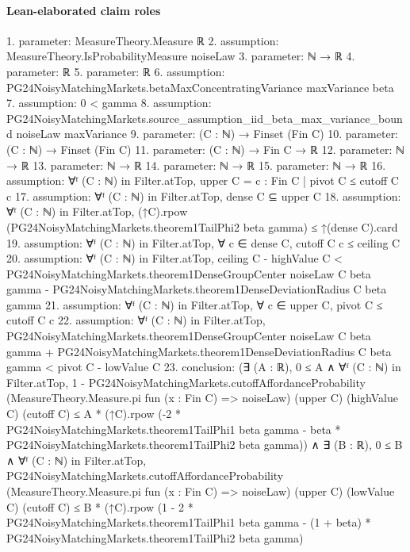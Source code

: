 \documentclass[10pt]{article}
\begin{document}
\paragraph{Lean-elaborated claim roles}\begin{ReviewVerbatim}
1. parameter: MeasureTheory.Measure ℝ
2. assumption: MeasureTheory.IsProbabilityMeasure noiseLaw
3. parameter: ℕ → ℝ
4. parameter: ℝ
5. parameter: ℝ
6. assumption: PG24NoisyMatchingMarkets.betaMaxConcentratingVariance maxVariance beta
7. assumption: 0 < gamma
8. assumption: PG24NoisyMatchingMarkets.source_assumption_iid_beta_max_variance_bound noiseLaw maxVariance
9. parameter: (C : ℕ) → Finset (Fin C)
10. parameter: (C : ℕ) → Finset (Fin C)
11. parameter: (C : ℕ) → Fin C → ℝ
12. parameter: ℕ → ℝ
13. parameter: ℕ → ℝ
14. parameter: ℕ → ℝ
15. parameter: ℕ → ℝ
16. assumption: ∀ᶠ (C : ℕ) in Filter.atTop, upper C = {c : Fin C | pivot C ≤ cutoff C c}
17. assumption: ∀ᶠ (C : ℕ) in Filter.atTop, dense C ⊆ upper C
18. assumption: ∀ᶠ (C : ℕ) in Filter.atTop, (↑C).rpow (PG24NoisyMatchingMarkets.theorem1TailPhi2 beta gamma) ≤ ↑(dense C).card
19. assumption: ∀ᶠ (C : ℕ) in Filter.atTop, ∀ c ∈ dense C, cutoff C c ≤ ceiling C
20. assumption: ∀ᶠ (C : ℕ) in Filter.atTop,
  ceiling C - highValue C <
    PG24NoisyMatchingMarkets.theorem1DenseGroupCenter noiseLaw C beta gamma -
      PG24NoisyMatchingMarkets.theorem1DenseDeviationRadius C beta gamma
21. assumption: ∀ᶠ (C : ℕ) in Filter.atTop, ∀ c ∈ upper C, pivot C ≤ cutoff C c
22. assumption: ∀ᶠ (C : ℕ) in Filter.atTop,
  PG24NoisyMatchingMarkets.theorem1DenseGroupCenter noiseLaw C beta gamma +
      PG24NoisyMatchingMarkets.theorem1DenseDeviationRadius C beta gamma <
    pivot C - lowValue C
23. conclusion: (∃ (A : ℝ),
    0 ≤ A ∧
      ∀ᶠ (C : ℕ) in Filter.atTop,
        1 -
            PG24NoisyMatchingMarkets.cutoffAffordanceProbability (MeasureTheory.Measure.pi fun (x : Fin C) => noiseLaw)
              (upper C) (highValue C) (cutoff C) ≤
          A *
            (↑C).rpow
              (-2 * PG24NoisyMatchingMarkets.theorem1TailPhi1 beta gamma -
                beta * PG24NoisyMatchingMarkets.theorem1TailPhi2 beta gamma)) ∧
  ∃ (B : ℝ),
    0 ≤ B ∧
      ∀ᶠ (C : ℕ) in Filter.atTop,
        PG24NoisyMatchingMarkets.cutoffAffordanceProbability (MeasureTheory.Measure.pi fun (x : Fin C) => noiseLaw)
            (upper C) (lowValue C) (cutoff C) ≤
          B *
            (↑C).rpow
              (1 - 2 * PG24NoisyMatchingMarkets.theorem1TailPhi1 beta gamma -
                (1 + beta) * PG24NoisyMatchingMarkets.theorem1TailPhi2 beta gamma)
\end{ReviewVerbatim}
\end{document}
